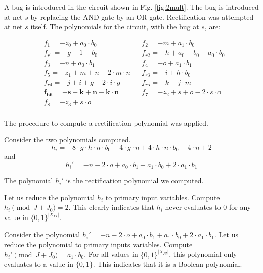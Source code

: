 \begin{Example}
A bug is introduced in the circuit shown in Fig. \ref{fig:2mult}. The bug is introduced at net $s$ by replacing the AND gate by an OR gate. Rectification was attempted at net $s$ itself. 
The polynomials for the circuit, with the bug at $s$, are:

\begin{align*}
& f_1 = -z_0+a_0\cdot b_0 && f_2 = -m+a_1\cdot b_0 \\
& f_{r1} = -g+1-b_0 && f_{r2} = -h+a_0+b_0 - a_0\cdot b_0 \\
& f_3 = -n+a_0\cdot b_1 && f_4 = -o+a_1\cdot b_1 \\
& f_5 = -z_1+m+n-2\cdot m \cdot n && f_{r3} = -i+h \cdot b_0 \\
& f_{r4} = -j+i+g-2 \cdot i \cdot g && f_{r5} = -k+j \cdot m \\
& \mathbf{f_{b6} = -s+k+ n-k\cdot n} && f_7 = -z_2+s+o-2\cdot s \cdot o \\
& f_8 = -z_3+s\cdot o \\
\end{align*}

The procedure to compute a rectification polynomial was applied. 

Consider the two polynomials computed.
\vspace{-2mm}
$$h_i =  -8\cdot g\cdot h\cdot n\cdot b_0
+4\cdot g\cdot n
+4\cdot h\cdot n\cdot b_0
-4\cdot n
+2$$ and 
$$h_i' = -n-2\cdot o+a_0\cdot b_1+a_1\cdot b_0+2\cdot a_1\cdot b_1$$

The polynomial $h_i'$ is the rectification polynomial we computed.

Let us reduce the polynomial $h_i$ to primary input variables. Compute $h_i \pmod{J+J_0} = 2$. This clearly indicates that $h_i$ never evaluates to $0$ for any value in $\{0,1\}^{|X_{PI}|}$. 

Consider the polynomial $h_i' = -n-2\cdot o+a_0\cdot b_1+a_1\cdot b_0+2\cdot a_1\cdot b_1$. Let us reduce the polynomial to primary inputs variables. Compute $h_i' \pmod{J+J_0} = a_1 \cdot b_0$. For all values in $\{0,1\}^{|X_{PI}|}$, this polynomial only evaluates to a value in $\{0,1\}$. This indicates that it is a Boolean polynomial. 
\end{Example}







